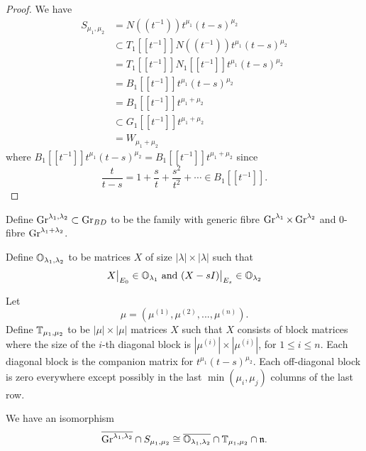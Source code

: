 \documentclass{article}
\begin{document}
\begin{proof}
We have
\[
\begin{split}
    S_{\mu_1, \mu_2} & = N((t^{-1}))t^{\mu_1}(t-s)^{\mu_2} \\
     & \subset T_1[[t^{-1}]] N((t^{-1})) t^{\mu_1} (t-s)^{\mu_2} \\
     & = T_1[[t^{-1}]] N_1[[t^{-1}]] t^{\mu_1} (t-s)^{\mu_2} \\
     & = B_1[[t^{-1}]] t^{\mu_1} (t-s)^{\mu_2} \\
     & = B_1[[t^{-1}]] t^{\mu_1 + \mu_2} \\
     & \subset G_1[[t^{-1}]] t^{\mu_1 + \mu_2} \\
     & = W_{\mu_1 + \mu_2}
\end{split}
\]
where $B_1[[t^{-1}]] t^{\mu_1} (t-s)^{\mu_2} = B_1[[t^{-1}]] t^{\mu_1 + \mu_2}$ since 
\[
\frac{t}{t-s} = 
1 + \frac{s}{t} + \frac{s^2}{t^2} + \cdots 
\in B_1[[t^{-1}]].
\]
\end{proof}

Define $\operatorname{Gr}^{\lambda_1, \lambda_2} \subset \operatorname{Gr}_{BD}$ to be the family with generic fibre $\operatorname{Gr}^{\lambda_1} \times \operatorname{Gr}^{\lambda_2}$ and 0-fibre $\operatorname{Gr}^{\lambda_1 + \lambda_2}$.

Define $\mathbb O_{\lambda_1, \lambda_2}$ to be matrices $X$ of size $|\lambda| \times |\lambda|$ such that 
\[
        X\big|_{E_0} \in \mathbb O_{\lambda_1} 
        \text{ and }
        (X-sI)\big|_{E_s} \in \mathbb O_{\lambda_2}
\]

Let 
\[
\mu = (\mu^{(1)}, \mu^{(2)}, ..., \mu^{(n)}).
\]
Define $\mathbb T_{\mu_1, \mu_2}$ to be $|\mu| \times |\mu|$ matrices $X$ such that $X$ consists of block matrices where the size of the $i$-th diagonal block is $|\mu^{(i)}| \times |\mu^{(i)}|$, for $1\leq i \leq n$. Each diagonal block is the companion matrix for $t^{\mu_1}(t-s)^{\mu_2}$. Each off-diagonal block is zero everywhere except possibly in the last $\min(\mu_i,\mu_j)$ columns of the last row. 

\begin{theorem}
We have an isomorphism
\[
    \overline{\operatorname{Gr}^{\lambda_1, \lambda_2}} \cap S_{\mu_1, \mu_2} \cong
    \overline{\mathbb O_{\lambda_1, \lambda_2}} \cap \mathbb T_{\mu_1, \mu_2} \cap \mathfrak n.
\]
\end{theorem}

\end{document}
